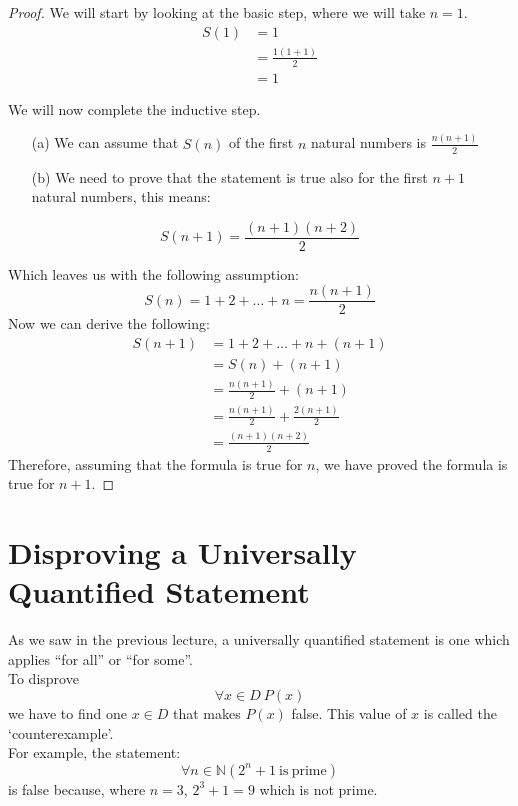 \begin{proof}
    We will start by looking at the basic step, where we will take $n=1$.
    \begin{align*}
        S(1) &= 1\\
        &= \frac{1(1+1)}{2}\\
        &= 1
    \end{align*}

    We will now complete the inductive step.
    \begin{itemize}
        \item[(a)] We can assume that $S(n)$ of the first $n$ natural numbers is $\displaystyle \frac{n(n+1)}{2}$
        \item[(b)] We need to prove that the statement is true also for the first $n+1$ natural numbers, this means:
    \end{itemize}
    \[S(n+1) = \frac{(n+1) (n+2)}{2}\]
    
    Which  leaves us with the following assumption:
    \[S(n) = 1 + 2 + \ldots + n = \frac{n(n+1)}{2}\]
    Now we can derive the following:
    \begin{align*}
        S(n+1) &= 1 + 2 + \ldots + n + (n+1)\\
        &= S(n) + (n+1)\\
        &= \frac{n(n+1)}{2} + (n+1)\\
        &= \frac{n(n+1)}{2} + \frac{2(n+1)}{2}\\
        &= \frac{(n+1)(n+2)}{2}
    \end{align*}
    Therefore, assuming that the formula is true for $n$, we have proved the formula is true for $n+1$.
\end{proof}

\section{Disproving a Universally Quantified Statement}
As we saw in the previous lecture, a universally quantified statement is one which applies ``for all'' or ``for some''.\\

To disprove
\[\forall x \in D\ P(x)\]
we have to find one $x \in D$ that makes $P(x)$ false. This value of $x$ is called the `counterexample'.\\

For example, the statement:
\[\forall n \in \mathbb{N} (2^n+1\ \mathrm{is\ prime})\]
is false because, where $n=3$, $2^3+1=9$ which is not prime.